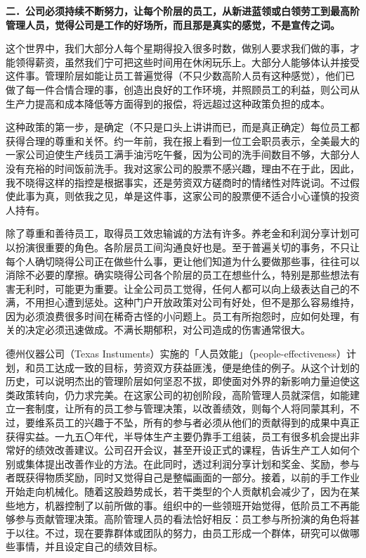 \documentclass[UTF8,a4paper,zihao=-4,fontset = windows]{ctexart} %
\begin{document}
\textbf{二．公司必须持续不断努力，让每个阶层的员工，从新进蓝领或白领劳工到最高阶管理人员，觉得公司是工作的好场所，而且那是真实的感觉，不是宣传之词。}


这个世界中，我们大部分人每个星期得投入很多时数，做别人要求我们做的事，才能领得薪资，虽然我们宁可把这些时间用在休闲玩乐上。大部分人能够体认并接受这件事。管理阶层如能让员工普遍觉得（不只少数高阶人员有这种感觉），他们已做了每一件合情合理的事，创造出良好的工作环境，并照顾员工的利益，则公司从生产力提高和成本降低等方面得到的报偿，将远超过这种政策负担的成本。

这种政策的第一步，是确定（不只是口头上讲讲而已，而是真正确定）每位员工都获得合理的尊重和关怀。约一年前，我在报上看到一位工会职员表示，全美最大的一家公司迫使生产线员工满手油污吃午餐，因为公司的洗手间数目不够，大部分人没有充裕的时间饭前洗手。我对这家公司的股票不感兴趣，理由不在于此，因此，我不晓得这样的指控是根据事实，还是劳资双方磋商时的情绪性对阵说词。不过假使此事为真，则依我之见，单是这件事，这家公司的股票便不适合小心谨慎的投资人持有。

除了尊重和善待员工，取得员工效忠输诚的方法有许多。养老金和利润分享计划可以扮演很重要的角色。各阶层员工间沟通良好也是。至于普遍关切的事务，不只让每个人确切晓得公司正在做些什么事，更让他们知道为什么要做那些事，往往可以消除不必要的摩擦。确实晓得公司各个阶层的员工在想些什么，特别是那些想法有害无利时，可能更为重要。让全公司员工觉得，任何人都可以向上级表达自己的不满，不用担心遭到惩处。这种门户开放政策对公司有好处，但不是那么容易维持，因为必须浪费很多时间在稀奇古怪的小问题上。员工有所抱怨时，应如何处理，有关的决定必须迅速做成。不满长期郁积，对公司造成的伤害通常很大。

德州仪器公司（Texas Instuments）实施的「人员效能」（people-effectiveness）计划，和员工达成一致的目标，劳资双方获益匪浅，便是绝佳的例子。从这个计划的历史，可以说明杰出的管理阶层如何坚忍不拔，即使面对外界的新影响力量迫使这类政策转向，仍力求完美。在这家公司的初创阶段，高阶管理人员就深信，如能建立一套制度，让所有的员工参与管理决策，以改善绩效，则每个人将同蒙其利，不过，要维系员工的兴趣于不坠，所有的参与者必须从他们的贡献得到的成果中真正获得实益。一九五〇年代，半导体生产主要仍靠手工组装，员工有很多机会提出非常好的绩效改善建议。公司召开会议，甚至开设正式的课程，告诉生产工人如何个别或集体提出改善作业的方法。在此同时，透过利润分享计划和奖金、奖励，参与者既获得物质奖励，同时又觉得自己是整幅画面的一部分。接着，以前的手工作业开始走向机械化。随着这股趋势成长，若干类型的个人贡献机会减少了，因为在某些地方，机器控制了以前所做的事。组织中的一些领班开始觉得，低阶员工不再能够参与贡献管理决策。高阶管理人员的看法恰好相反：员工参与所扮演的角色将甚于以往。不过，现在要靠群体或团队的努力，由员工形成一个群体，研究可以做哪些事情，并且设定自己的绩效目标。
\end{document}
